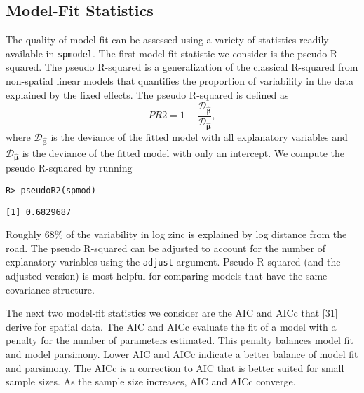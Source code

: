 \documentclass[10pt,letterpaper]{article}
\begin{document}
\hypertarget{model-fit-statistics}{%
\subsection{Model-Fit Statistics}\label{model-fit-statistics}}

The quality of model fit can be assessed using a variety of statistics
readily available in \texttt{spmodel}. The first model-fit statistic we
consider is the pseudo R-squared. The pseudo R-squared is a
generalization of the classical R-squared from non-spatial linear models
that quantifies the proportion of variability in the data explained by
the fixed effects. The pseudo R-squared is defined as \begin{equation*}
PR2 = 1 - \frac{\mathcal{D}_{\boldsymbol{\hat{\beta}}}}{\mathcal{D}_{\boldsymbol{\hat{\mu}}}},
\end{equation*} where \(\mathcal{D}_{\boldsymbol{\hat{\beta}}}\) is the
deviance of the fitted model with all explanatory variables and
\(\mathcal{D}_{\boldsymbol{\hat{\mu}}}\) is the deviance of the fitted
model with only an intercept. We compute the pseudo R-squared by running

\begin{verbatim}
R> pseudoR2(spmod)
\end{verbatim}

\begin{verbatim}
[1] 0.6829687
\end{verbatim}

\noindent Roughly 68\% of the variability in log zinc is explained by
log distance from the road. The pseudo R-squared can be adjusted to
account for the number of explanatory variables using the
\texttt{adjust} argument. Pseudo R-squared (and the adjusted version) is
most helpful for comparing models that have the same covariance
structure.

The next two model-fit statistics we consider are the AIC and AICc that
{[}31{]} derive for spatial data. The AIC and AICc evaluate the fit of a
model with a penalty for the number of parameters estimated. This
penalty balances model fit and model parsimony. Lower AIC and AICc
indicate a better balance of model fit and parsimony. The AICc is a
correction to AIC that is better suited for small sample sizes. As the
sample size increases, AIC and AICc converge.
\end{document}

